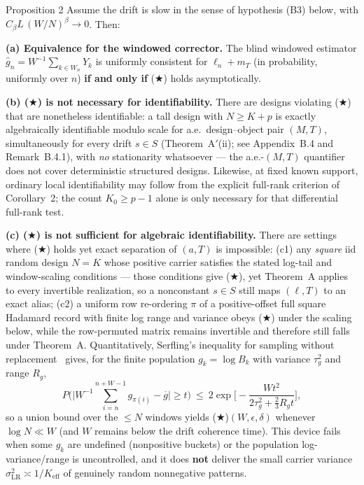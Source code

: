 \begin{namedthm}{Proposition 2}
Assume the drift is slow in the sense of hypothesis (B3) below, with $C_\beta L\,(W/N)^\beta\to0$. Then:

\textbf{(a) Equivalence for the windowed corrector.} The blind windowed estimator $\hat g_n=W^{-1}\sum_{k\in W_n}Y_k$ is uniformly consistent for $\ell_n+m_T$ (in probability, uniformly over $n$) \textbf{if and only if} ($\bigstar$) holds asymptotically.

\textbf{(b) ($\bigstar$) is not necessary for identifiability.} There are designs violating ($\bigstar$) that are nonetheless identifiable: a tall design with $N\ge K+p$ is exactly algebraically identifiable modulo scale for a.e.\ design--object pair $(M,T)$, simultaneously for every drift $s\in S$ (Theorem~A$'$(ii); see Appendix~B.4 and Remark~B.4.1), with \emph{no} stationarity whatsoever --- the a.e.-$(M,T)$ quantifier does not cover deterministic structured designs. Likewise, at fixed known support, ordinary local identifiability may follow from the explicit full-rank criterion of Corollary~2; the count $K_0\ge p-1$ alone is only necessary for that differential full-rank test.

\textbf{(c) ($\bigstar$) is not sufficient for algebraic identifiability.} There are settings where ($\bigstar$) holds yet exact separation of $(a,T)$ is impossible: (c1) any \emph{square} iid random design $N=K$ whose positive carrier satisfies the stated log-tail and window-scaling conditions --- those conditions give ($\bigstar$), yet Theorem~A applies to every invertible realization, so a nonconstant $s\in S$ still maps $(\ell,T)$ to an exact alias; (c2) a uniform row re-ordering $\pi$ of a positive-offset full square Hadamard record with finite log range and variance obeys ($\bigstar$) under the scaling below, while the row-permuted matrix remains invertible and therefore still falls under Theorem~A. Quantitatively, Serfling's inequality for sampling without replacement~\cite{Serfling1974} gives, for the finite population $g_k=\log B_k$ with variance $\tau_g^2$ and range $R_g$,
\[
P\Big(\Big|W^{-1}\!\!\sum_{i=n}^{n+W-1} g_{\pi(i)}-\overline g\Big|\ge t\Big)\ \le\ 2\exp\!\Big[-\frac{W t^2}{2\tau_g^2+\tfrac23 R_g t}\Big],
\]
so a union bound over the $\le N$ windows yields ($\bigstar$)$(W,\epsilon,\delta)$ whenever $\log N\ll W$ (and $W$ remains below the drift coherence time). This device fails when some $g_k$ are undefined (nonpositive buckets) or the population log-variance/range is uncontrolled, and it does \textbf{not} deliver the small carrier variance $\sigma_{\mathrm{LR}}^2\asymp1/K_{\mathrm{eff}}$ of genuinely random nonnegative patterns.
\end{namedthm}

